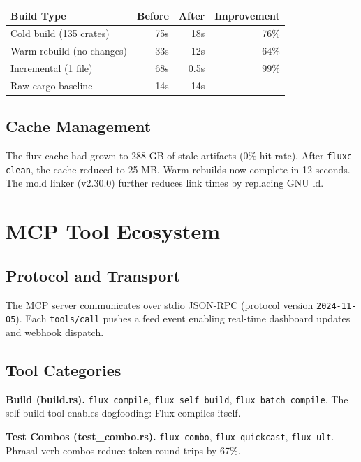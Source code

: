 \documentclass[11pt,a4paper]{article}
\begin{document}
\begin{center}
\begin{tabular}{lrrr}
\toprule
\textbf{Build Type} & \textbf{Before} & \textbf{After} & \textbf{Improvement} \\
\midrule
Cold build (135 crates) & 75s & 18s & 76\% \\
Warm rebuild (no changes) & 33s & 12s & 64\% \\
Incremental (1 file) & 68s & 0.5s & 99\% \\
Raw cargo baseline & 14s & 14s & — \\
\bottomrule
\end{tabular}
\end{center}

\subsection{Cache Management}

The flux-cache had grown to 288 GB of stale artifacts (0\% hit rate). After \texttt{fluxc clean}, the cache reduced to 25 MB. Warm rebuilds now complete in 12 seconds. The mold linker (v2.30.0) further reduces link times by replacing GNU ld.

\section{MCP Tool Ecosystem}

\subsection{Protocol and Transport}

The MCP server communicates over stdio JSON-RPC (protocol version \texttt{2024-11-05}). Each \texttt{tools/call} pushes a feed event enabling real-time dashboard updates and webhook dispatch.

\subsection{Tool Categories}

\textbf{Build (build.rs).} \texttt{flux\_compile}, \texttt{flux\_self\_build}, \texttt{flux\_batch\_compile}. The self-build tool enables dogfooding: Flux compiles itself.

\textbf{Test Combos (test\_combo.rs).} \texttt{flux\_combo}, \texttt{flux\_quickcast}, \texttt{flux\_ult}. Phrasal verb combos reduce token round-trips by 67\%.
\end{document}
